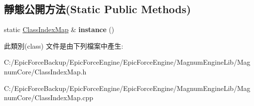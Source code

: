 \subsection*{靜態公開方法(Static Public Methods)}
\begin{DoxyCompactItemize}
\item 
static \hyperlink{class_magnum_1_1_class_index_map}{Class\+Index\+Map} \& {\bfseries instance} ()\hypertarget{class_magnum_1_1_class_index_map_a4b4fca66f4b175decbe3dbf4dc3715b5}{}\label{class_magnum_1_1_class_index_map_a4b4fca66f4b175decbe3dbf4dc3715b5}

\end{DoxyCompactItemize}


此類別(class) 文件是由下列檔案中產生\+:\begin{DoxyCompactItemize}
\item 
C\+:/\+Epic\+Force\+Backup/\+Epic\+Force\+Engine/\+Epic\+Force\+Engine/\+Magnum\+Engine\+Lib/\+Magnum\+Core/Class\+Index\+Map.\+h\item 
C\+:/\+Epic\+Force\+Backup/\+Epic\+Force\+Engine/\+Epic\+Force\+Engine/\+Magnum\+Engine\+Lib/\+Magnum\+Core/Class\+Index\+Map.\+cpp\end{DoxyCompactItemize}
